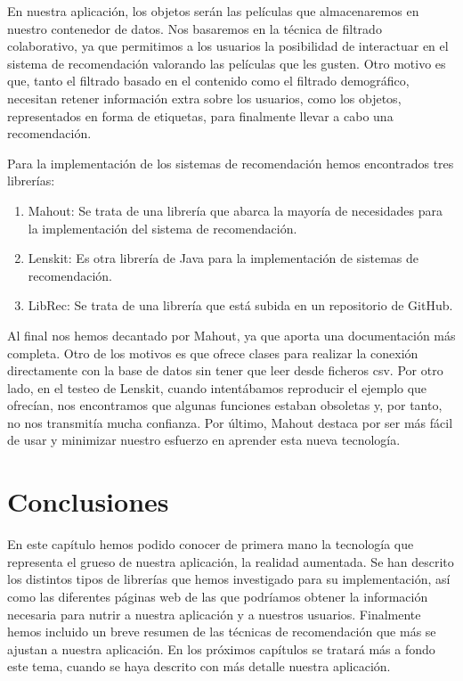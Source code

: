 En nuestra aplicación, los objetos serán las películas que almacenaremos en nuestro contenedor de datos. Nos basaremos en 
la técnica de filtrado colaborativo, ya que permitimos a los usuarios la posibilidad de 
interactuar en el sistema de recomendación valorando las películas que les gusten. Otro motivo es que, tanto el filtrado basado
en el contenido como el filtrado demográfico, necesitan retener información extra sobre los usuarios, como los objetos, representados 
en forma de etiquetas, para finalmente llevar a cabo una recomendación.

Para la implementación de los sistemas de recomendación hemos encontrados tres librerías:
\begin{enumerate}
    \item Mahout: Se trata de una librería que abarca la mayoría de necesidades para la implementación del sistema de recomendación.
    \item Lenskit: Es otra librería de Java para la implementación de sistemas de recomendación.
    \item LibRec: Se trata de una librería que está subida en un repositorio de GitHub.
\end{enumerate}

Al final nos hemos decantado por Mahout, ya que aporta una documentación más completa. Otro de los motivos es que ofrece clases para realizar la conexión directamente con la base de datos 
sin tener que leer desde ficheros csv. Por otro lado, en el testeo de 
Lenskit, cuando intentábamos reproducir el ejemplo que ofrecían, nos encontramos que algunas funciones estaban 
obsoletas y, por tanto, no nos transmitía mucha confianza. Por último, Mahout destaca por ser más fácil de usar y minimizar nuestro esfuerzo en aprender esta nueva tecnología.

\section{Conclusiones}
\label{makereference2.4}
En este capítulo hemos podido conocer de primera mano la tecnología que representa el grueso de nuestra aplicación, la realidad aumentada. Se han descrito 
los distintos tipos de librerías que hemos investigado para su implementación, así como las diferentes páginas web de las que podríamos obtener la información necesaria
para nutrir a nuestra aplicación y a nuestros usuarios. Finalmente hemos incluido un breve resumen de las técnicas de recomendación que más se ajustan a nuestra aplicación. En los próximos capítulos
se tratará más a fondo este tema, cuando se haya descrito con más detalle nuestra aplicación.

